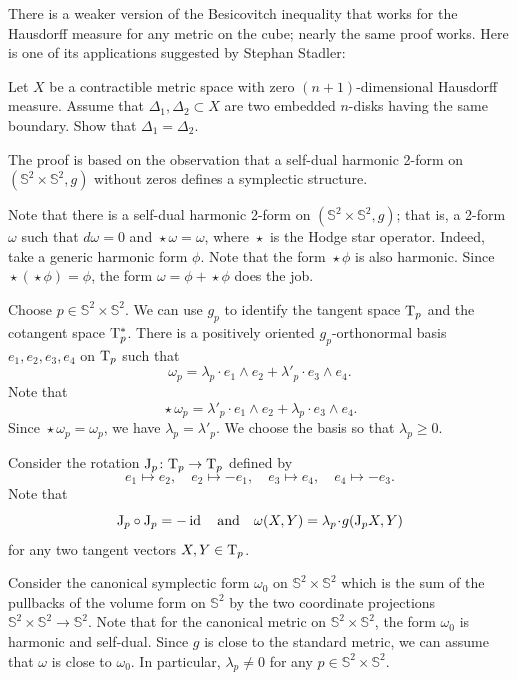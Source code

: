 There is a weaker version of the Besicovitch inequality that works for the Hausdorff measure for any metric on the cube; nearly the same proof works.
Here is one of its applications suggested by Stephan Stadler:

\begin{pr}
Let $X$ be a contractible metric space with zero $(n+1)$-dimensional Hausdorff measure.
Assume that $\Delta_1,\Delta_2\subset X$ are two embedded $n$-disks having the same boundary.
Show that $\Delta_1=\Delta_2$.
\end{pr}



The proof is based on the observation that a self-dual harmonic 2-form on $(\mathbb{S}^2\times\mathbb{S}^2,g)$
without zeros defines a symplectic structure.

\medskip

Note that there is a self-dual harmonic 2-form on $(\mathbb{S}^2\times\mathbb{S}^2,g)$;
that is, a 2-form $\omega$ such that $d\omega=0$ and $\mathop{\star}\omega=\omega$,
where $\mathop{\star}$ is the Hodge star operator.
Indeed, take a generic harmonic form $\phi$.
Note that the form $\mathop{\star}\phi$ is also harmonic.
Since $\mathop{\star}(\mathop{\star}\phi)=\phi$,
the form $\omega=\phi+\mathop{\star}\phi$ does the job.

Choose $p\in \mathbb{S}^2\times\mathbb{S}^2$.
We can use $g_p$ to identify the tangent space $\mathrm{T}_p$ and the cotangent space $\mathrm{T}^*_p$.
There is a positively oriented $g_p$-orthonormal basis $e_1, e_2, e_3, e_4$ on $\mathrm{T}_p$ such that
\[\omega_p=\lambda_p\cdot e_1\wedge e_2+\lambda'_p\cdot  e_3\wedge e_4.\]
Note that 
\[\mathop{\star}\omega_p=\lambda'_p\cdot e_1\wedge e_2+\lambda_p\cdot  e_3\wedge e_4.\]
Since $\mathop{\star}\omega_p=\omega_p$, we have $\lambda_p=\lambda'_p$.
We choose the basis so that $\lambda_p\ge0$.

Consider the rotation $\mathrm{J}_p\colon\mathrm{T}_p\to\mathrm{T}_p$ defined by 
\[ 
e_1\mapsto e_2,
\quad 
e_2\mapsto -e_1,
\quad 
e_3\mapsto e_4,
\quad 
e_4\mapsto -e_3.\]
Note that
\[\mathrm{J}_p\circ\mathrm{J}_p =-\id
\quad\text{and}\quad
\omega(X,Y)=\lambda_p\cdot g(\mathrm{J}_pX,Y)\]
for any two tangent vectors $X,Y\in \mathrm{T}_p$.

Consider the canonical symplectic form $\omega_0$ on $\mathbb{S}^2\times\mathbb{S}^2$ which is the sum of the pullbacks of the volume form on $\mathbb{S}^2$  
by the two coordinate projections $\mathbb{S}^2\times\mathbb{S}^2\to \mathbb{S}^2$.
Note that for the canonical metric on $\mathbb{S}^2\times\mathbb{S}^2$,
the form $\omega_0$ is harmonic and self-dual. 
Since $g$ is close to the standard metric,
we can assume that $\omega$ is close to $\omega_0$.
In particular, $\lambda_p\ne0$ for any $p\in \mathbb{S}^2\times\mathbb{S}^2$.

